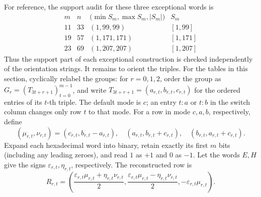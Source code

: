 For reference, the support audit for these three exceptional words is
\[
\begin{array}{c|c|c|c}
m&n&\bigl(\min S_m,\max S_m,|S_m|\bigr)&S_m\\\hline
11&33&(1,99,99)&[1,99]\\
19&57&(1,171,171)&[1,171]\\
23&69&(1,207,207)&[1,207]
\end{array}
\]
Thus the support part of each exceptional construction is checked independently of the
orientation strings.  It remains to orient the triples. For the tables in this section,
cyclically relabel the groups: for \(r=0,1,2\), order the group as
\(G_r=(T_{3t+r+1})_{t=0}^{m-1}\), and write
\(T_{3t+r+1}=(a_{r,t},b_{r,t},c_{r,t})\) for the ordered
entries of its \(t\)-th triple.  The default mode is \(c\); an entry \(t:a\) or
\(t:b\) in the switch column changes only row \(t\) to that mode.  For a row in mode
\(c,a,b\), respectively, define
\[
(\mu_{r,t},\nu_{r,t})=
(c_{r,t},b_{r,t}-a_{r,t}),\quad
(a_{r,t},b_{r,t}+c_{r,t}),\quad
(b_{r,t},a_{r,t}+c_{r,t}).
\]
Expand each hexadecimal word into binary, retain exactly its first \(m\) bits (including any
leading zeroes), and read \(1\) as \(+1\) and \(0\) as \(-1\).  Let the words \(E,H\) give the signs
\(\varepsilon_{r,t},\eta_{r,t}\), respectively.  The reconstructed row is
\begin{equation}\label{eq:exceptional-row}
R_{r,t}=\left(\frac{\varepsilon_{r,t}\mu_{r,t}+\eta_{r,t}\nu_{r,t}}{2},
\frac{\varepsilon_{r,t}\mu_{r,t}-\eta_{r,t}\nu_{r,t}}{2},-\varepsilon_{r,t}\mu_{r,t}\right).
\end{equation}
\begingroup\scriptsize
\setlength{\LTleft}{0pt}\setlength{\LTright}{0pt}
